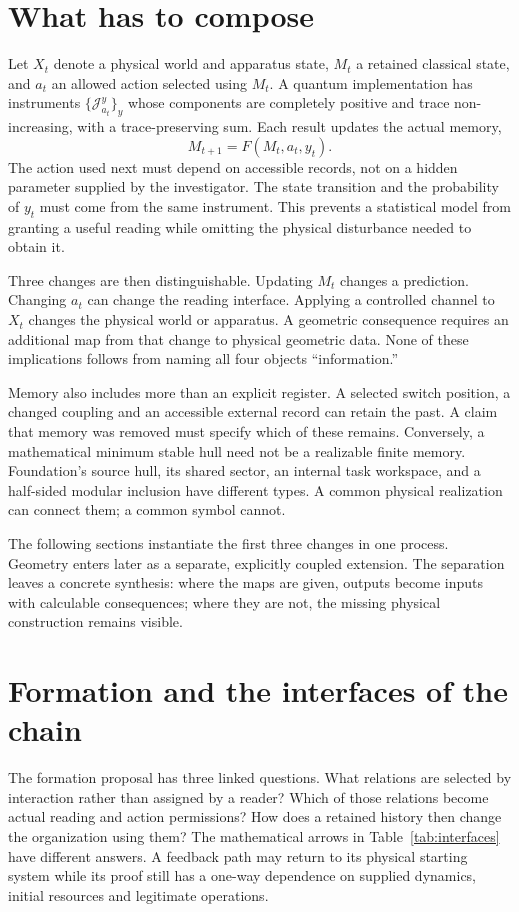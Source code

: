 \documentclass[11pt,a4paper]{article}
\begin{document}
\section{What has to compose}

Let $X_t$ denote a physical world and apparatus state, $M_t$ a retained classical state, and $a_t$ an allowed action selected using $M_t$. A quantum implementation has instruments $\{\mathcal J_{a_t}^y\}_y$ whose components are completely positive and trace non-increasing, with a trace-preserving sum. Each result updates the actual memory,
\[
 M_{t+1}=F(M_t,a_t,y_t).
\]
The action used next must depend on accessible records, not on a hidden parameter supplied by the investigator. The state transition and the probability of $y_t$ must come from the same instrument. This prevents a statistical model from granting a useful reading while omitting the physical disturbance needed to obtain it.

Three changes are then distinguishable. Updating $M_t$ changes a prediction. Changing $a_t$ can change the reading interface. Applying a controlled channel to $X_t$ changes the physical world or apparatus. A geometric consequence requires an additional map from that change to physical geometric data. None of these implications follows from naming all four objects ``information.''

Memory also includes more than an explicit register. A selected switch position, a changed coupling and an accessible external record can retain the past. A claim that memory was removed must specify which of these remains. Conversely, a mathematical minimum stable hull need not be a realizable finite memory. Foundation's source hull, its shared sector, an internal task workspace, and a half-sided modular inclusion have different types. A common physical realization can connect them; a common symbol cannot.

The following sections instantiate the first three changes in one process. Geometry enters later as a separate, explicitly coupled extension. The separation leaves a concrete synthesis: where the maps are given, outputs become inputs with calculable consequences; where they are not, the missing physical construction remains visible.

\section{Formation and the interfaces of the chain}
\label{sec:interfaces}

The formation proposal has three linked questions. What relations are
selected by interaction rather than assigned by a reader? Which of those
relations become actual reading and action permissions? How does a
retained history then change the organization using them?
The mathematical arrows in Table~\ref{tab:interfaces} have different
answers. A feedback path may return to its physical starting system
while its proof still has a one-way dependence on supplied dynamics,
initial resources and legitimate operations.
\end{document}
